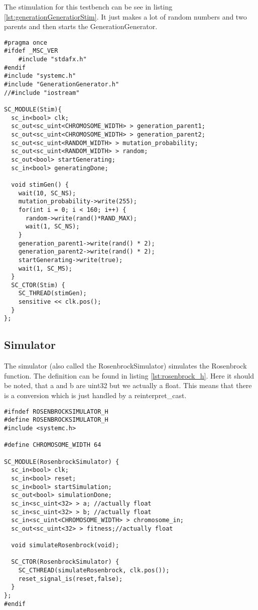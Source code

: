 The stimulation for this testbench can be see in listing \ref{lst:generationGeneratiorStim}. It just makes a lot of random numbers and two parents and then starts the GenerationGenerator.

\begin{lstlisting}[style=customc++,caption={Stimulation for Generationgenerator},label={lst:generationGeneratiorStim}]
#pragma once
#ifdef _MSC_VER
	#include "stdafx.h"
#endif
#include "systemc.h"
#include "GenerationGenerator.h"
//#include "iostream"

SC_MODULE(Stim){
  sc_in<bool> clk;
  sc_out<sc_uint<CHROMOSOME_WIDTH> > generation_parent1;
  sc_out<sc_uint<CHROMOSOME_WIDTH> > generation_parent2;
  sc_out<sc_uint<RANDOM_WIDTH> > mutation_probability;
  sc_out<sc_uint<RANDOM_WIDTH> > random;
  sc_out<bool> startGenerating;
  sc_in<bool> generatingDone;

  void stimGen() {
    wait(10, SC_NS);
    mutation_probability->write(255);
    for(int i = 0; i < 160; i++) {
      random->write(rand()*RAND_MAX);
      wait(1, SC_NS);
    }
    generation_parent1->write(rand() * 2);
    generation_parent2->write(rand() * 2);
    startGenerating->write(true);
    wait(1, SC_MS);
  }
  SC_CTOR(Stim) {
    SC_THREAD(stimGen);
    sensitive << clk.pos();
  }
};
\end{lstlisting}


\subsection{Simulator}
The simulator (also called the RosenbrockSimulator) simulates the Rosenbrock function. The definition can be found in listing \ref{lst:rosenbrock_h}. Here it should be noted, that a and b are uint32 but we actually a float. This means that there is a conversion which is just handled by a reinterpret\_cast.

\begin{lstlisting}[style=customc++,caption={RosenbrockSimulator.h},label={lst:rosenbrock_h}]
#ifndef ROSENBROCKSIMULATOR_H
#define ROSENBROCKSIMULATOR_H
#include <systemc.h>

#define CHROMOSOME_WIDTH 64

SC_MODULE(RosenbrockSimulator) {
  sc_in<bool> clk;
  sc_in<bool> reset;
  sc_in<bool> startSimulation;
  sc_out<bool> simulationDone;
  sc_in<sc_uint<32> > a; //actually float
  sc_in<sc_uint<32> > b; //actually float
  sc_in<sc_uint<CHROMOSOME_WIDTH> > chromosome_in;
  sc_out<sc_uint<32> > fitness;//actually float

  void simulateRosenbrock(void);

  SC_CTOR(RosenbrockSimulator) {
    SC_CTHREAD(simulateRosenbrock, clk.pos());
    reset_signal_is(reset,false);
  }
};
#endif
\end{lstlisting}

